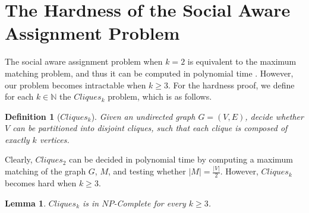 \documentclass[letterpaper]{article} %
\newtheorem{lemma}{Lemma}
\newtheorem{definition}{Definition}
\begin{document}
\section{The Hardness of the Social Aware Assignment Problem}
The social aware assignment problem when $k=2$ is equivalent to the maximum matching problem, and thus it can be computed in polynomial time \cite{edmons1965paths}.
However, our problem becomes intractable when $k \geq 3$. 
For the hardness proof, we define for each $k \in \mathbb{N}$ the $Cliques_k$ problem, which is as follows.
\begin{definition}[$Cliques_k$]
Given an undirected graph $G=(V,E)$, decide whether $V$ can be partitioned into disjoint cliques, such that each clique is composed of exactly $k$ vertices.
\end{definition}
Clearly, $Cliques_2$ can be decided in polynomial time by computing a maximum matching of the graph $G$, $M$, and testing whether $|M| = \frac{|V|}{2}$.
However, $Cliques_k$ becomes hard when $k\geq 3$.
\begin{lemma}
$Cliques_k$ is in $NP$-Complete for every $k\geq3$.
\end{lemma}
\end{document}
